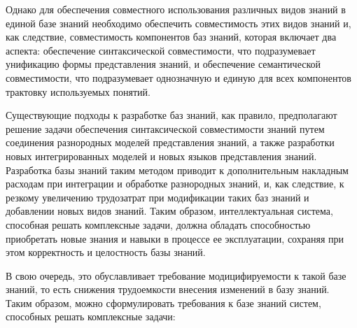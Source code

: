 Однако для обеспечения совместного использования различных видов знаний в единой базе знаний необходимо обеспечить совместимость этих видов знаний и, как следствие, совместимость компонентов баз знаний, которая включает два аспекта: обеспечение синтаксической совместимости, что подразумевает унификацию формы представления знаний, и обеспечение семантической совместимости, что подразумевает однозначную и единую для всех компонентов трактовку используемых понятий.

Существующие подходы к разработке баз знаний, как правило, предполагают решение задачи обеспечения синтаксической совместимости знаний путем соединения разнородных моделей представления знаний, а также разработки новых интегрированных моделей и новых языков представления знаний.
Разработка базы знаний таким методом приводит к дополнительным накладным расходам при интеграции и обработке разнородных знаний, и, как следствие, к резкому увеличению трудозатрат при модификации таких баз знаний и добавлении новых видов знаний.
Таким образом, интеллектуальная система, способная решать комплексные задачи, должна обладать способностью приобретать новые знания и навыки в процессе ее эксплуатации, сохраняя при этом корректность и целостность базы знаний.

В свою очередь, это обуславливает требование модицифируемости к такой базе знаний, то есть снижения трудоемкости внесения изменений в базу знаний.
Таким образом, можно сформулировать требования к базе знаний систем, способных решать комплексные задачи:

